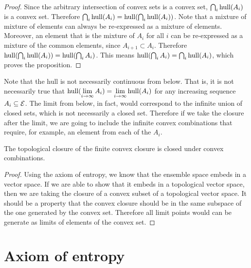 \begin{mathSection}
\begin{proof}
	Since the arbitrary intersection of convex sets is a convex set, $\bigcap_i \mathrm{hull}(A_i)$ is a convex set. Therefore $\bigcap_i \mathrm{hull}(A_i) = \mathrm{hull}(\bigcap_i \mathrm{hull}(A_i))$. Note that a mixture of mixture of elements can always be re-expressed as a mixture of elements. Moreover, an element that is the mixture of $A_i$ for all $i$ can be re-expressed as a mixture of the common elements, since $A_{i+1} \subset A_i$. Therefore $\mathrm{hull}(\bigcap_i \mathrm{hull}(A_i)) = \mathrm{hull}(\bigcap_i A_i)$. This means $\mathrm{hull}(\bigcap_i A_i) = \bigcap_i \mathrm{hull}(A_i)$, which proves the proposition.
\end{proof}

\begin{remark}
	Note that the hull is not necessarily continuous from below. That is, it is not necessarily true that $\mathrm{hull}(\lim\limits_{i \to \infty} A_i) = \lim\limits_{i \to \infty} \mathrm{hull}(A_i)$ for any increasing sequence $A_i \subseteq \mathcal{E}$. The limit from below, in fact, would correspond to the infinite union of closed sets, which is not necessarily a closed set. Therefore if we take the closure after the limit, we are going to include the infinite convex combinations that require, for example, an element from each of the $A_i$.
\end{remark}
\end{mathSection}

\begin{conj}
	The topological closure of the finite convex closure is closed under convex combinations.
\end{conj}

\begin{proof}
	Using the axiom of entropy, we know that the ensemble space embeds in a vector space. If we are able to show that it embeds in a topological vector space, then we are taking the closure of a convex subset of a topological vector space. It should be a property that the convex closure should be in the same subspace of the one generated by the convex set. Therefore all limit points would can be generate as limits of elements of the convex set.
\end{proof}

\section{Axiom of entropy}

